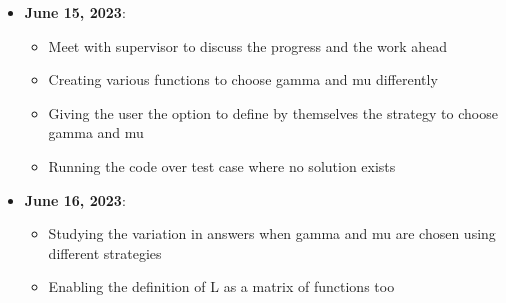\documentclass[a4paper,11pt,fleqn]{article}
\theoremstyle{plain}{\theorembodyfont{\rmfamily}%
\newtheorem{conjecture}[theorem]{Conjecture}}
\theoremstyle{plain}{\theorembodyfont{\rmfamily}%
\newtheorem{example}[theorem]{Example}}
\theoremstyle{plain}{\theorembodyfont{\rmfamily}%
\newtheorem{remark}[theorem]{Remark}}
\theoremstyle{plain}{\theorembodyfont{\rmfamily}%
\newtheorem{algorithm}[theorem]{Algorithm}}
\theoremstyle{plain}{\theorembodyfont{\rmfamily}%
\newtheorem{condition}[theorem]{Condition}}
\theoremstyle{plain}{\theorembodyfont{\rmfamily}%
\newtheorem{definition}[theorem]{Definition}}
\theoremstyle{plain}{\theorembodyfont{\rmfamily}
\newtheorem{fact}[theorem]{Fact}}
\theoremstyle{plain}{\theorembodyfont{\rmfamily}
\newtheorem{problem}[theorem]{Problem}}
\theoremstyle{plain}{\theorembodyfont{\rmfamily}
\newtheorem{notation}[theorem]{Notation}}
\theoremstyle{plain}{\theorembodyfont{\rmfamily}
\newtheorem{project}[theorem]{Project}}
\begin{document}
\begin{itemize}
\item {\bf June 15, 2023}:
\begin{itemize} 
\item Meet with supervisor to discuss the progress and the work ahead
\item Creating various functions to choose gamma and mu differently
\item Giving the user the option to define by themselves the strategy to choose gamma and mu
\item Running the code over test case where no solution exists
\end{itemize}

\item {\bf June 16, 2023}:
\begin{itemize} 
\item Studying the variation in answers when gamma and mu are chosen using different strategies
\item Enabling the definition of L as a matrix of functions too
\end{itemize}

\end{itemize}



\end{document}
